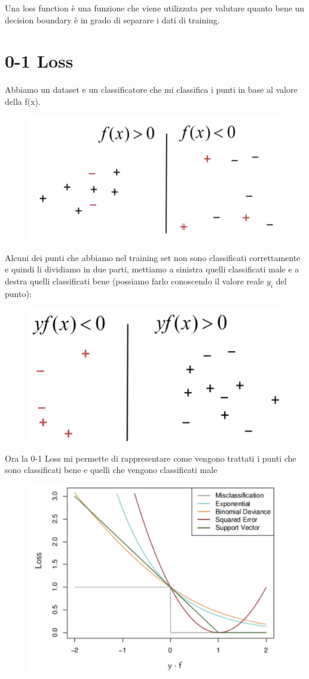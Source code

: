 \documentclass[14pt]{extreport}
\begin{document}
Una loss function è una funzione che viene utilizzata per valutare quanto bene un decision boundary è in grado di separare i dati di training.

\section{0-1 Loss}

Abbiamo un dataset e un classificatore che mi classifica i punti in base al valore della f(x).
\begin{figure}[H]
\centering
\includegraphics[width=0.5\linewidth]{330.jpeg}
\end{figure}

Alcuni dei punti che abbiamo nel training set non sono classificati correttamente e quindi li dividiamo in due parti, mettiamo a sinistra quelli
classificati male e a destra quelli classificati bene (possiamo farlo conoscendo il valore reale $y_i$ del punto):

\begin{figure}[H]
\centering
\includegraphics[width=0.5\linewidth]{329.jpeg}
\end{figure}

Ora la 0-1 Loss mi permette di rappresentare come vengono trattati i punti che sono classificati bene e quelli che vengono classificati male

\begin{figure}[H]
\centering
\includegraphics[width=0.5\linewidth]{331.jpeg}
\end{figure}
\end{document}
